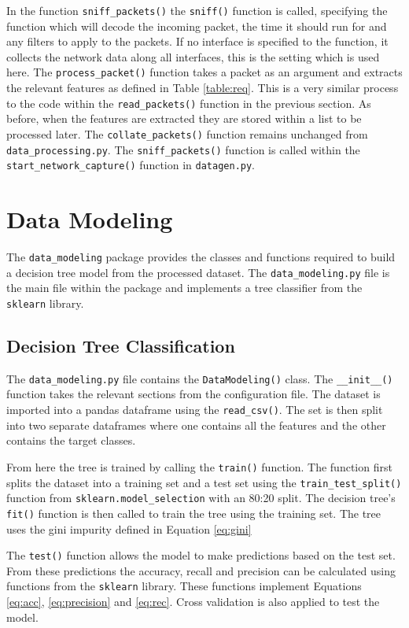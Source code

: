 In the function \texttt{sniff\_packets()} the \texttt{sniff()} function is called, specifying the function which will decode the incoming packet, the time it should run for and any filters to apply to the packets. If no interface is specified to the function, it collects the network data along all interfaces, this is the setting which is used here. The \texttt{process\_packet()} function takes a packet as an argument and extracts the relevant features as defined in Table \ref{table:req}. This is a very similar process to the code within the \texttt{read\_packets()} function in the previous section. As before, when the features are extracted they are stored within a list to be processed later. The \texttt{collate\_packets()} function remains unchanged from \texttt{data\_processing.py}. The \texttt{sniff\_packets()} function is called within the \texttt{start\_network\_capture()} function in \texttt{datagen.py}.

\section{Data Modeling}
The \texttt{data\_modeling} package provides the classes and functions required to build a decision tree model from the processed dataset. The \texttt{data\_modeling.py} file is the main file within the package and implements a tree classifier from the \texttt{sklearn} library.

\subsection{Decision Tree Classification}
The \texttt{data\_modeling.py} file contains the \texttt{DataModeling()} class. The \texttt{\_\_init\_\_()} function takes the relevant sections from the configuration file. The dataset is imported into a pandas dataframe using the \texttt{read\_csv()}. The set is then split into two separate dataframes where one contains all the features and the other contains the target classes.

From here the tree is trained by calling the \texttt{train()} function. The function first splits the dataset into a training set and a test set using the \texttt{train\_test\_split()} function from \texttt{sklearn.model\_selection} with an 80:20 split. The decision tree’s \texttt{fit()} function is then called to train the tree using the training set. The tree uses the gini impurity defined in Equation \ref{eq:gini}

The \texttt{test()} function allows the model to make predictions based on the test set. From these predictions the accuracy, recall and precision can be calculated using functions from the \texttt{sklearn} library. These functions implement Equations \ref{eq:acc}, \ref{eq:precision} and \ref{eq:rec}. Cross validation is also applied to test the model.

